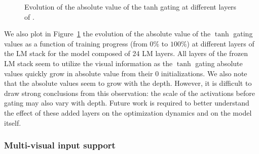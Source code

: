 \begin{figure}[t] 
 \captionsetup[subfigure]{justification=centering}
  \hfill 
  \caption{\capfontsize{} Evolution of the absolute value of the tanh gating at different layers of \base{}.
  } 
  \label{fig:tanh_gating_evolution}
\end{figure}


We also plot in Figure~\ref{fig:tanh_gating_evolution} the evolution of the absolute value of the $\tanh$ gating values as a function of training progress (from $0\%$ to $100\%$) at different layers of the LM stack for the \base{} model composed of 24 LM layers.
All layers of the frozen LM stack seem to utilize the visual information as the $\tanh$ gating absolute values quickly grow in absolute value from their 0 initializations.
We also note that the absolute values seem to grow with the depth.
However, it is difficult to draw strong conclusions from this observation: the scale of the activations before gating may also vary with depth.
Future work is required to better understand the effect of these added layers on the optimization dynamics and on the model itself.



\subsubsection{Multi-visual input support}
\label{app:multi-visual-details}

